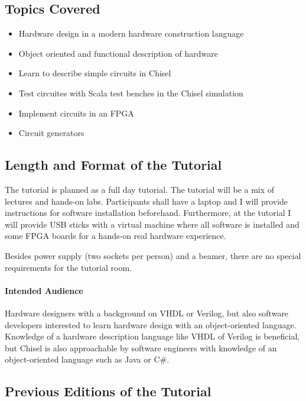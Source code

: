 \documentclass{article}
\begin{document}
\subsection*{Topics Covered}

\begin{itemize}
\item Hardware design in a modern hardware construction language
\item Object oriented and functional description of hardware
\item Learn to describe simple circuits in Chisel
\item Test circuites with Scala test benches in the Chisel simulation
\item Implement circuits in an FPGA
\item Circuit generators
\end{itemize}

\subsection*{Length and Format of the Tutorial}

The tutorial is planned as a full day tutorial.
The tutorial will be a mix of lectures and hands-on labs. Participants shall have a laptop and I will provide
instructions for software installation beforehand. Furthermore, at the tutorial I will provide USB sticks
with a virtual machine where all software is installed and some FPGA boards for a hands-on real
hardware experience.

Besides power supply (two sockets per person) and a beamer, there are no special requirements for the tutorial room.

\paragraph{Intended Audience}

Hardware designers with a background on VHDL or Verilog, but also software developers
interested to learn hardware design with an object-oriented language.
Knowledge of a hardware description language like VHDL of Verilog is beneficial, but Chisel is also
approachable by software engineers with knowledge of an object-oriented language such as Java or C\#.
 

\subsection*{Previous Editions of the Tutorial}
\end{document}
